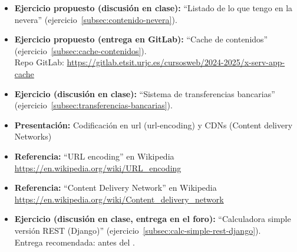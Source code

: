 \documentclass[a4paper,12pt]{article}
\begin{document}
\begin{itemize}

\item \textbf{Ejercicio propuesto (discusión en clase):} ``Listado de lo que tengo en la nevera'' (ejercicio~\ref{subsec:contenido-nevera}). \\
\item \textbf{Ejercicio propuesto (entrega en GitLab):} ``Cache de contenidos'' (ejercicio~\ref{subsec:cache-contenidos}). \\
  Repo GitLab: \url{https://gitlab.etsit.urjc.es/cursosweb/2024-2025/x-serv-app-cache} 
\item \textbf{Ejercicio (discusión en clase):} ``Sistema de transferencias bancarias'' (ejercicio~\ref{subsec:transferencias-bancarias}).
\item \textbf{Presentación:} Codificación en url (url-encoding) y CDNs (Content delivery Networks)
\item \textbf{Referencia:} ``URL encoding'' en Wikipedia \\ \url{https://en.wikipedia.org/wiki/URL_encoding}
\item \textbf{Referencia:} ``Content Delivery Network'' en Wikipedia \\ \url{https://en.wikipedia.org/wiki/Content_delivery_network}
\item \textbf{Ejercicio (discusión en clase, entrega en el foro):} ``Calculadora simple versión REST (Django)'' (ejercicio~\ref{subsec:calc-simple-rest-django}). \\
  Entrega recomendada: antes del \martesH.
\end{itemize}



\end{document}
